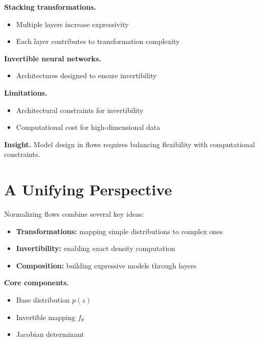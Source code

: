 \noindent
\textbf{Stacking transformations.}
\begin{itemize}
    \item Multiple layers increase expressivity
    \item Each layer contributes to transformation complexity
\end{itemize}

\medskip

\noindent
\textbf{Invertible neural networks.}
\begin{itemize}
    \item Architectures designed to ensure invertibility
\end{itemize}

\medskip

\noindent
\textbf{Limitations.}
\begin{itemize}
    \item Architectural constraints for invertibility
    \item Computational cost for high-dimensional data
\end{itemize}

\medskip

\noindent
\textbf{Insight.}  
Model design in flows requires balancing flexibility with computational constraints.

\section{A Unifying Perspective}

Normalizing flows combine several key ideas:

\begin{itemize}
    \item \textbf{Transformations:} mapping simple distributions to complex ones
    \item \textbf{Invertibility:} enabling exact density computation
    \item \textbf{Composition:} building expressive models through layers
\end{itemize}

\medskip

\noindent
\textbf{Core components.}
\begin{itemize}
    \item Base distribution $p(z)$
    \item Invertible mapping $f_\theta$
    \item Jacobian determinant
\end{itemize}

